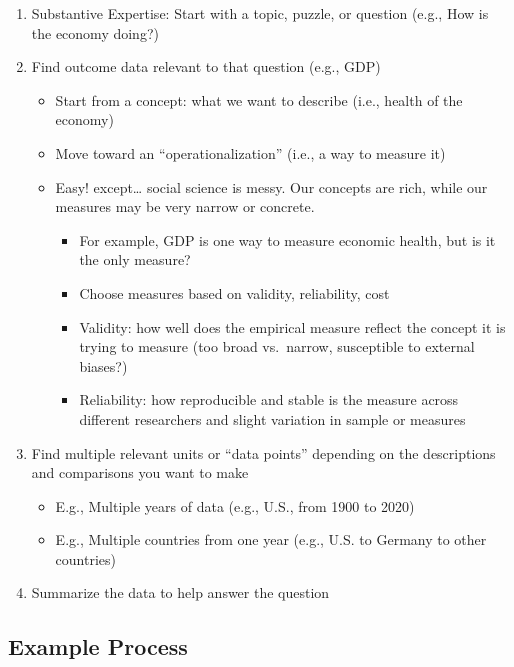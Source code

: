 \documentclass[
  letterpaper,
  DIV=11,
  numbers=noendperiod]{scrreprt}
\providecommand{\tightlist}{%
  \setlength{\itemsep}{0pt}\setlength{\parskip}{0pt}}\usepackage{longtable,booktabs,array}
\begin{document}
\begin{enumerate}
\def\labelenumi{\arabic{enumi}.}
\tightlist
\item
  Substantive Expertise: Start with a topic, puzzle, or question (e.g.,
  How is the economy doing?)
\item
  Find outcome data relevant to that question (e.g., GDP)

  \begin{itemize}
  \tightlist
  \item
    Start from a concept: what we want to describe (i.e., health of the
    economy)
  \item
    Move toward an ``operationalization'' (i.e., a way to measure it)
  \item
    Easy! except\ldots{} social science is messy. Our concepts are rich,
    while our measures may be very narrow or concrete.

    \begin{itemize}
    \tightlist
    \item
      For example, GDP is one way to measure economic health, but is it
      the only measure?
    \item
      Choose measures based on validity, reliability, cost
    \item
      Validity: how well does the empirical measure reflect the concept
      it is trying to measure (too broad vs.~narrow, susceptible to
      external biases?)
    \item
      Reliability: how reproducible and stable is the measure across
      different researchers and slight variation in sample or measures
    \end{itemize}
  \end{itemize}
\item
  Find multiple relevant units or ``data points'' depending on the
  descriptions and comparisons you want to make

  \begin{itemize}
  \tightlist
  \item
    E.g., Multiple years of data (e.g., U.S., from 1900 to 2020)
  \item
    E.g., Multiple countries from one year (e.g., U.S. to Germany to
    other countries)
  \end{itemize}
\item
  Summarize the data to help answer the question
\end{enumerate}

\hypertarget{example-process}{%
\subsection{Example Process}\label{example-process}}
\end{document}
